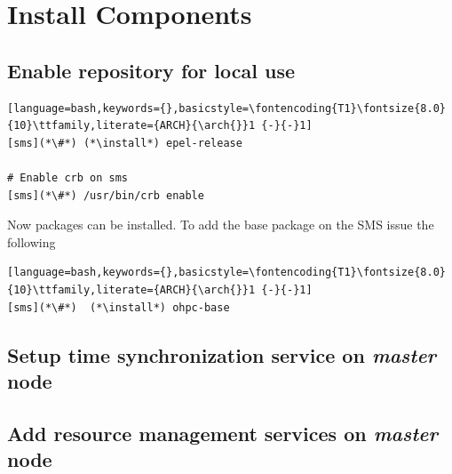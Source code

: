 \documentclass[letterpaper]{article}
\newcommand{\arch}{x86\_64}
\newcommand{\install}{dnf -y install}
\begin{document}
\section{Install \OHPC{} Components}\label{sec:basic_install}


\subsection{Enable \OHPC{} repository for local use}\label{sec:enable_repo}






\begin{lstlisting}[language=bash,keywords={},basicstyle=\fontencoding{T1}\fontsize{8.0}{10}\ttfamily,literate={ARCH}{\arch{}}1 {-}{-}1]
[sms](*\#*) (*\install*) epel-release

# Enable crb on sms
[sms](*\#*) /usr/bin/crb enable
\end{lstlisting}

Now \OHPC{} packages can be installed. To add the base package on the SMS
issue the following
\begin{lstlisting}[language=bash,keywords={},basicstyle=\fontencoding{T1}\fontsize{8.0}{10}\ttfamily,literate={ARCH}{\arch{}}1 {-}{-}1]
[sms](*\#*)  (*\install*) ohpc-base
\end{lstlisting}



\subsection{Setup time synchronization service on {\em master} node}\label{sec:add_ntp}



\subsection{Add resource management services on {\em master} node}\label{sec:add_rm}

\end{document}
